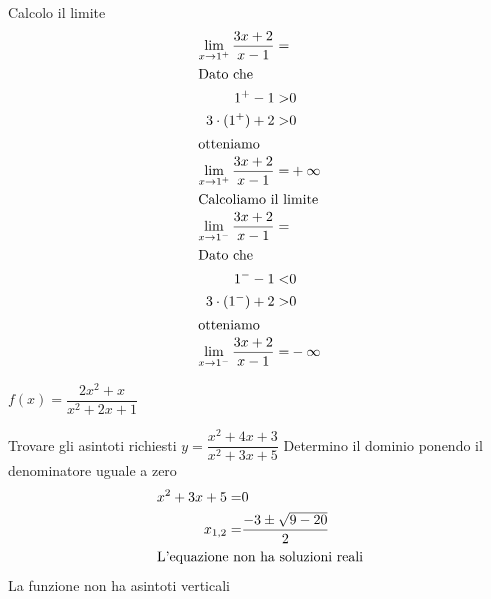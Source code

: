 \begin{exercise}
Calcolo il limite
\begin{align*}
\lim_{x\to 1^+}\frac{3x+2}{x-1}=&\\
\intertext{Dato che}
1^+-1>&0\\
3\cdot (1^+)+2>&0\\
\intertext{otteniamo}
\lim_{x\to 1^+}\frac{3x+2}{x-1}=&+\infty\\
\intertext{Calcoliamo il limite}
\lim_{x\to 1^-}\frac{3x+2}{x-1}=&\\
\intertext{Dato che}
1^--1<&0\\
3\cdot (1^-)+2>&0\\
\intertext{otteniamo}
\lim_{x\to 1^-}\frac{3x+2}{x-1}=&-\infty\\
\end{align*} 
\end{exercise}
\begin{exercise}[no solution]
	$f(x)= \dfrac{2x^2+x}{x^2+2x+1}$
\end{exercise}
\begin{exercise}
	Trovare gli asintoti richiesti
$y=\dfrac{x^2+4x+3}{x^2+3x+5}$
	\tcblower
Determino il dominio ponendo il denominatore uguale a zero
\begin{align*}
x^2+3x+5=&0\\ 
x_{1,2}=&\dfrac{-3\pm\sqrt{9-20}}{2}\\
\intertext{L'equazione non ha soluzioni reali}
\end{align*}
La funzione non ha asintoti verticali
\end{exercise}
